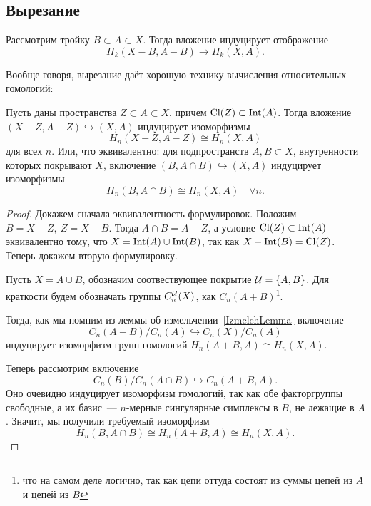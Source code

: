     \subsection{Вырезание}

    Рассмотрим тройку $B \subset A \subset X$. Тогда вложение индуцирует отображение
    \[ H_{k}(X - B, A - B) \to H_{k}(X, A). \]

    Вообще говоря, вырезание даёт хорошую технику вычисления относительных гомологий:

    \begin{theorem}[О вырезании]\label{CuttingTheorem}
        Пусть даны пространства $Z \subset A \subset X$, причем $\operatorname{Cl}(Z) \subset \operatorname{Int}(A)$. Тогда вложение
        $(X - Z, A - Z) \hookrightarrow (X, A)$ индуцирует изоморфизмы
        \[ H_{n}(X - Z, A - Z) \cong H_{n}(X, A) \]
        для всех $n$. Или, что эквивалентно: для подпространств $A, B \subset X$, внутренности которых покрывают $X$,
        включение $(B, A \cap B) \hookrightarrow (X, A)$  индуцирует изоморфизмы
        \[ H_{n}(B, A \cap B) \cong H_{n}(X, A) \quad \forall n. \]
    \end{theorem}

    \begin{proof}
        Докажем сначала эквивалентность формулировок.  Положим $B = X - Z, \ Z = X - B$.
        Тогда $A \cap B = A - Z$, а условие $\operatorname{Cl}(Z) \subset \operatorname{Int}(A)$ эквивалентно тому, что
        $X = \operatorname{Int}(A) \cup \operatorname{Int}(B)$, так как $X - \operatorname{Int}(B) = \operatorname{Cl}(Z)$. Теперь докажем вторую формулировку.

        Пусть $X = A \cup B$, обозначим соотвествующее покрытие $\mathcal{U} = \{ A, B \}$. Для краткости будем обозначать группы
        $C^{\mathcal{U}}_{n}(X)$, как $C_{n}(A + B)$\footnote{что на самом деле логично, так как цепи оттуда состоят из суммы цепей из $A$ и цепей из $B$}.

        Тогда, как мы помним из леммы об измельчении~\ref{IzmelchLemma} включение
        \[ C_{n}(A + B)/C_{n}(A) \hookrightarrow C_{n}(X)/C_{n}(A) \]
        индуцирует изоморфизм групп гомологий $H_{n}(A + B, A) \cong H_{n}(X, A)$.

        Теперь рассмотрим включение
        \[ C_{n}(B)/C_{n}(A \cap B) \hookrightarrow C_{n}(A + B, A). \]
        Оно очевидно индуцирует изоморфизм гомологий, так как обе факторгруппы свободные, а их базис~--- $n$-мерные сингулярные симплексы в $B$, не лежащие в $A$.
        Значит, мы получили требуемый изоморфизм
        \[ H_{n}(B, A \cap B) \cong H_{n}(A + B, A) \cong H_{n}(X, A). \]

    \end{proof}

